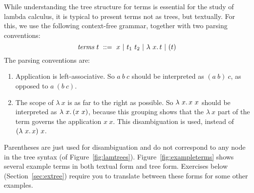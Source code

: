 While understanding the tree structure for terms is essential for the
study of lambda calculus, it is typical to present terms not as trees,
but textually.  For this, we use the following context-free
grammar, together with two parsing conventions:
\[
\textit{terms}\ t\ ::=\ x\ |\ t_1\ t_2\ |\ \lam{x}{t}\ |\ ( t )
\]
\noindent The parsing conventions are:
\begin{enumerate}
\item Application is left-associative.  So $a\ b\ c$ should be interpreted as $(a\ b)\ c$, as opposed to $a\ (b\ c)$.
\item The scope of $\lambda\ x$ is as far to the right as possible.  So $\lambda\ x.\, x\ x$ should be interpreted as $\lambda\ x.\, (x\ x)$, because this grouping shows that the $\lambda\ x$ part of the term governs the application $x\ x$.  This disambiguation is used, instead of $(\lambda\ x.\, x)\ x$.
\end{enumerate}
\noindent Parentheses are just used for disambiguation and do not
correspond to any node in the tree syntax (of
Figure~\ref{fig:lamtrees}).  Figure~\ref{fig:exampleterms} shows
several example terms in both textual form and tree form.  Exercises
below (Section~\ref{sec:extree}) require you to translate between
these forms for some other examples.

